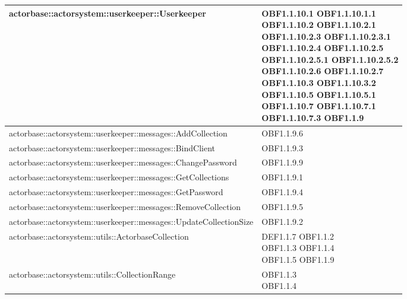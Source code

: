 \documentclass{scalatekids-article}
\begin{document}
\begin{longtable}[H]{|p{12cm}|p{5.5cm}|}
\hline
actorbase::actorsystem::userkeeper::Userkeeper & \multiLineCell[t]{OBF1.1.10.1 OBF1.1.10.1.1\\OBF1.1.10.2 OBF1.1.10.2.1\\OBF1.1.10.2.3 OBF1.1.10.2.3.1\\OBF1.1.10.2.4 OBF1.1.10.2.5\\OBF1.1.10.2.5.1 OBF1.1.10.2.5.2\\OBF1.1.10.2.6 OBF1.1.10.2.7\\OBF1.1.10.3 OBF1.1.10.3.2\\OBF1.1.10.5 OBF1.1.10.5.1\\OBF1.1.10.7 OBF1.1.10.7.1\\OBF1.1.10.7.3 OBF1.1.9\\}\\
\hline
actorbase::actorsystem::userkeeper::messages::AddCollection & \multiLineCell[t]{OBF1.1.9.6\\}\\
\hline
actorbase::actorsystem::userkeeper::messages::BindClient & \multiLineCell[t]{OBF1.1.9.3\\}\\
\hline
actorbase::actorsystem::userkeeper::messages::ChangePassword & \multiLineCell[t]{OBF1.1.9.9\\}\\
\hline
actorbase::actorsystem::userkeeper::messages::GetCollections & \multiLineCell[t]{OBF1.1.9.1\\}\\
\hline
actorbase::actorsystem::userkeeper::messages::GetPassword & \multiLineCell[t]{OBF1.1.9.4\\}\\
\hline
actorbase::actorsystem::userkeeper::messages::RemoveCollection & \multiLineCell[t]{OBF1.1.9.5\\}\\
\hline
actorbase::actorsystem::userkeeper::messages::UpdateCollectionSize & \multiLineCell[t]{OBF1.1.9.2\\}\\
\hline
actorbase::actorsystem::utils::ActorbaseCollection & \multiLineCell[t]{DEF1.1.7 OBF1.1.2\\OBF1.1.3 OBF1.1.4\\OBF1.1.5 OBF1.1.9\\}\\
\hline
actorbase::actorsystem::utils::CollectionRange & \multiLineCell[t]{OBF1.1.3\\OBF1.1.4\\}\\

\end{longtable}
\end{document}
